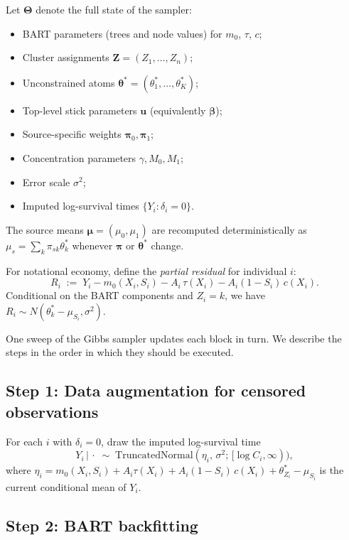 \documentclass[11pt]{article}
\theoremstyle{plain}
\theoremstyle{definition}
\theoremstyle{remark}
\newcommand{\1}{\mathds{1}}
\newcommand{\given}{\,|\,}
\begin{document}
Let $\bm{\Theta}$ denote the full state of the sampler:
\begin{itemize}[noitemsep]
\item BART parameters (trees and node values) for $m_0$, $\tau$, $c$;
\item Cluster assignments $\bm{Z} = (Z_1, \ldots, Z_n)$;
\item Unconstrained atoms $\bm{\theta}^* = (\theta_1^*, \ldots, \theta_K^*)$;
\item Top-level stick parameters $\bm{u}$ (equivalently $\bm{\beta}$);
\item Source-specific weights $\bm{\pi}_0, \bm{\pi}_1$;
\item Concentration parameters $\gamma, M_0, M_1$;
\item Error scale $\sigma^2$;
\item Imputed log-survival times $\{Y_i : \delta_i = 0\}$.
\end{itemize}
The source means $\bm{\mu} = (\mu_0, \mu_1)$ are recomputed deterministically as $\mu_s = \sum_k \pi_{sk} \theta_k^*$ whenever $\bm{\pi}$ or $\bm{\theta}^*$ change.

For notational economy, define the \emph{partial residual} for individual $i$:
\begin{equation}
R_i \;:=\; Y_i - m_0(X_i, S_i) - A_i\, \tau(X_i) - A_i(1 - S_i)\, c(X_i).
\label{eq:Ri}
\end{equation}
Conditional on the BART components and $Z_i = k$, we have $R_i \sim N(\theta_k^* - \mu_{S_i}, \sigma^2)$.

One sweep of the Gibbs sampler updates each block in turn. We describe the steps in the order in which they should be executed.

\subsection{Step 1: Data augmentation for censored observations}

For each $i$ with $\delta_i = 0$, draw the imputed log-survival time
\begin{equation}
Y_i \given \cdot \;\sim\; \mathrm{TruncatedNormal}(\eta_i,\, \sigma^2;\, [\log C_i, \infty)),
\end{equation}
where $\eta_i = m_0(X_i, S_i) + A_i \tau(X_i) + A_i(1 - S_i)\, c(X_i) + \theta_{Z_i}^* - \mu_{S_i}$ is the current conditional mean of $Y_i$.

\subsection{Step 2: BART backfitting}
\end{document}
